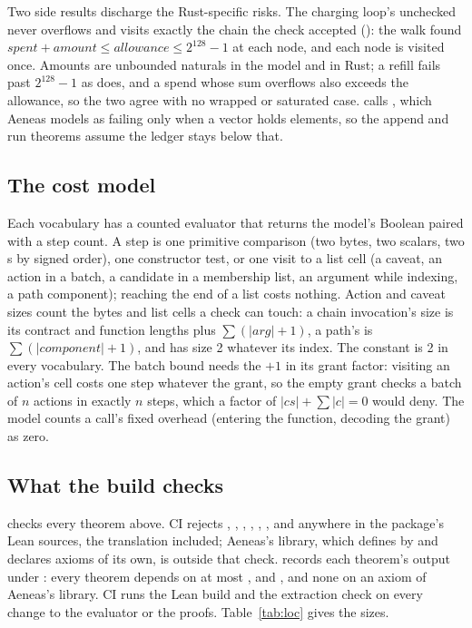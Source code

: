 Two side results discharge the Rust-specific risks. The charging loop's
unchecked  never overflows and visits exactly the chain
the check accepted ():
the walk found $\mathit{spent} + \mathit{amount} \le \mathit{allowance} \le
2^{128}-1$ at each node, and each node is visited once. Amounts are unbounded
naturals in the model and  in Rust; a refill fails past
$2^{128}-1$ as  does, and a spend whose sum overflows also
exceeds the allowance, so the two agree with no wrapped or saturated case.
 calls , which Aeneas models as failing only when
a vector holds  elements, so the append and run theorems
assume the ledger stays below that.

\subsection{The cost model}\label{sec:cost}

Each vocabulary has a counted evaluator that returns the model's Boolean paired
with a step count. A step is one primitive comparison (two bytes, two scalars,
two s by signed order), one constructor test, or one visit to a list
cell (a caveat, an action in a batch, a candidate in a membership list, an
argument while indexing, a path component); reaching the end of a list costs
nothing. Action and caveat sizes count the bytes and list cells a check can
touch: a chain invocation's size is its contract and function lengths plus
$\sum(|\mathit{arg}| + 1)$, a path's is $\sum(|\mathit{component}| + 1)$, and
 has size 2 whatever its index. The constant is 2 in every
vocabulary. The batch bound needs the $+1$ in its grant factor: visiting an
action's cell costs one step whatever the grant, so the empty grant checks a
batch of $n$ actions in exactly $n$ steps, which a factor of
$|cs| + \sum |c| = 0$ would deny. The model counts a call's fixed overhead
(entering the function, decoding the grant) as zero.

\subsection{What the build checks}

 checks every theorem above. CI rejects ,
, , , ,
,  and  anywhere in the
package's Lean sources, the translation included;
Aeneas's library, which defines  by  and
declares axioms of its own, is outside that check.  records
each theorem's  output under : every
theorem depends on at most ,  and
, and none on an axiom of Aeneas's
library. CI runs the Lean build and the extraction check
on every change to the evaluator or the proofs. Table~\ref{tab:loc} gives the
sizes.

